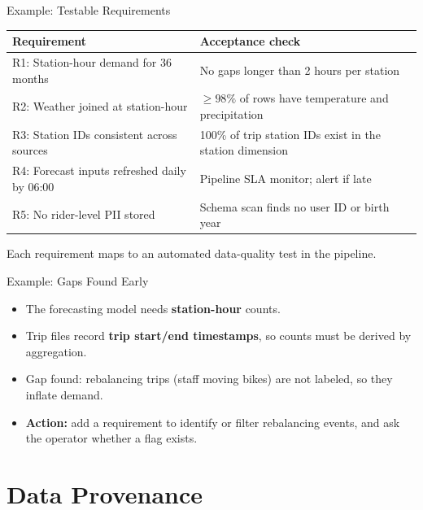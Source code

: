 \documentclass[aspectratio=43,11pt]{beamer}
\begin{document}
\begin{frame}{Example: Testable Requirements}
  \footnotesize
  \begin{tabular}{@{}p{5.1cm}p{5.1cm}@{}}
    \toprule
    \textbf{Requirement} & \textbf{Acceptance check} \\
    \midrule
    R1: Station-hour demand for 36 months & No gaps longer than 2 hours per station \\[3pt]
    R2: Weather joined at station-hour & $\geq 98\%$ of rows have temperature and precipitation \\[3pt]
    R3: Station IDs consistent across sources & 100\% of trip station IDs exist in the station dimension \\[3pt]
    R4: Forecast inputs refreshed daily by 06:00 & Pipeline SLA monitor; alert if late \\[3pt]
    R5: No rider-level PII stored & Schema scan finds no user ID or birth year \\
    \bottomrule
  \end{tabular}

  \normalsize
  \medskip
  Each requirement maps to an automated data-quality test in the pipeline.
\end{frame}

\begin{frame}{Example: Gaps Found Early}
  \begin{itemize}
    \item The forecasting model needs \textbf{station-hour} counts.
    \item Trip files record \textbf{trip start/end timestamps}, so counts must be
      derived by aggregation.
    \item \alert{Gap found:} rebalancing trips (staff moving bikes) are not labeled,
      so they inflate demand.
    \item \textbf{Action:} add a requirement to identify or filter rebalancing
      events, and ask the operator whether a flag exists.
  \end{itemize}
\end{frame}

\section{Data Provenance}
\end{document}
